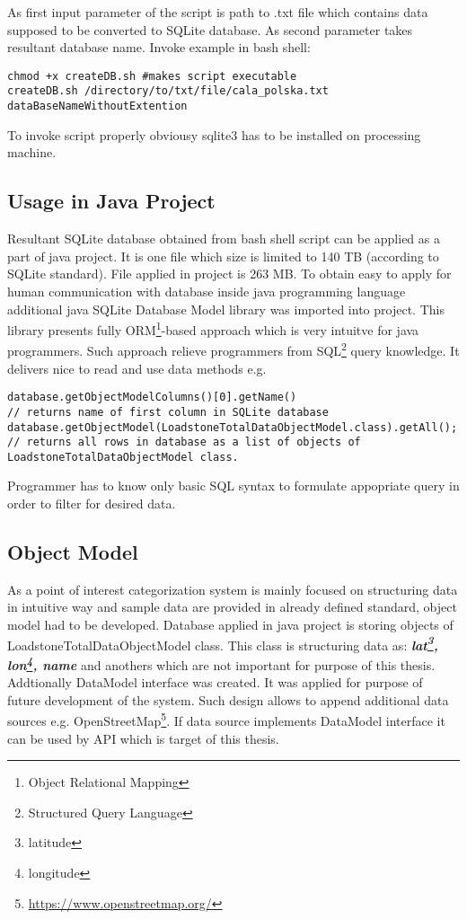 As first input parameter of the script is path to .txt file which contains data supposed to be converted to SQLite database. As second parameter takes resultant database name. Invoke example in bash shell:
\begin{lstlisting}[style=BASH]
chmod +x createDB.sh #makes script executable
createDB.sh /directory/to/txt/file/cala_polska.txt dataBaseNameWithoutExtention
\end{lstlisting}
To invoke script properly obviousy sqlite3 has to be installed on processing machine. 

\subsection{Usage in Java Project}
Resultant SQLite database obtained from bash shell script can be applied as a part of java project. It is one file which size is limited to 140 TB (according to SQLite standard). File applied in project is 263 MB. To obtain easy to apply for human communication with database inside java programming language additional java SQLite Database Model library was imported into project. \cite{31} This library presents fully ORM\footnote{Object Relational Mapping}-based approach which is very intuitve for java programmers. Such approach relieve programmers from SQL\footnote{Structured Query Language} query knowledge. It delivers nice to read and use data methods e.g.
\begin{lstlisting}[style=JAVA]
database.getObjectModelColumns()[0].getName()
// returns name of first column in SQLite database
database.getObjectModel(LoadstoneTotalDataObjectModel.class).getAll();
// returns all rows in database as a list of objects of LoadstoneTotalDataObjectModel class.
\end{lstlisting}
Programmer has to know only basic SQL syntax to formulate appopriate query in order to filter for desired data.
\subsection{Object Model}
As a point of interest categorization system is mainly focused on structuring data in intuitive way and sample data are provided in already defined standard, object model had to be developed. Database applied in java project is storing objects of LoadstoneTotalDataObjectModel class. This class is structuring data as: \textit{\textbf{lat\footnote{latitude}, lon\footnote{longitude}, name}} and anothers which are not important for purpose of this thesis. Addtionally DataModel interface was created. It was applied for purpose of future development of the system. Such design allows to append additional data sources e.g. OpenStreetMap\footnote{\url{https://www.openstreetmap.org/}}. If data source implements DataModel interface it can be used by API which is target of this thesis.      